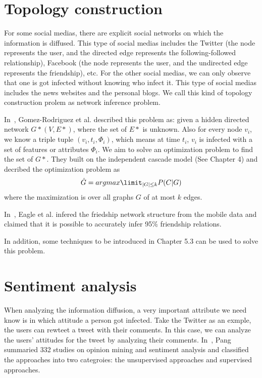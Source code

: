 \section{Topology construction}
For some social medias, there are explicit social networks on which the information is diffused. This type of social medias includes the Twitter (the node represents the user, and the directed edge represents the following-followed relationship), Facebook (the node represents the user, and the undirected edge represents the friendship), etc. For the other social medias, we can only observe that one is got infected without knowing who infect it. This type of social medias includes the news websites and the personal blogs. We call this kind of topology construction prolem as network inference problem.

In~\cite{gomez2010inferring}, Gomez-Rodriguez et al. described this problem as: given a hidden directed network $G*(V,E*)$, where the set of $E*$ is unknown. Also for every node $v_i$, we know a triple tuple $(v_i,t_i,\Phi_i)$, which means at time $t_i$, $v_i$ is infected with a set of features or attributes $\Phi_i$. We aim to solve an optimization problem to find the set of $G*$. They built on the independent cascade model (See Chapter 4) and decribed the optimization problem as $$\hat{G} = argmax\limit_{|G|\le k}P(C|G)$$ where the maximization is over all graphs $G$ of at most $k$ edges.

In~\cite{eagle2009inferring}, Eagle et al. infered the friedship network structure from the mobile data and claimed that it is possible to accurately infer 95\% friendship relations.

In addition, some techniques to be introduced in Chapter 5.3 can be used to solve this problem.

\section{Sentiment analysis}
When analyzing the information diffusion, a very important attribute we need know is in which attitude a person got infected. Take the Twitter as an exmple, the users can rewteet a tweet with their comments. In this case, we can analyze the users' attitudes for the tweet by analyzing their comments. In~\cite{pang2008opinion}, Pang summaried 332 studies on opinion mining and sentiment analysis and classified the approaches into two categroies: the unsupervised approaches and supervised approaches. 


